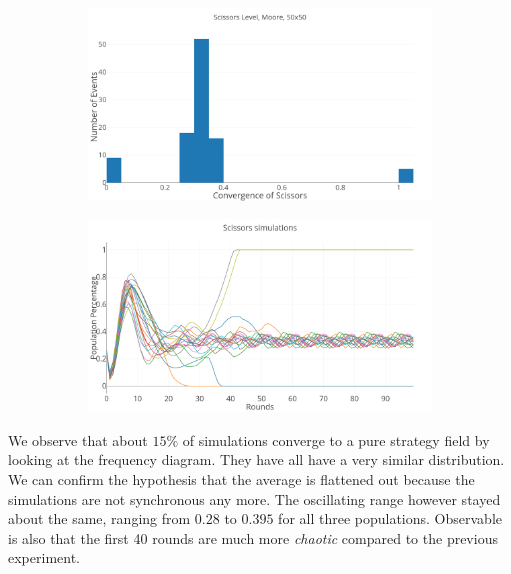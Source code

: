 \documentclass[a4paper, 11pt]{article}
\begin{document}
\begin{figure}[H]
	\begin{subfigure}{0.52\textwidth}
		\includegraphics[width=1\linewidth]{50x50_50RockDist_ScissorsHG}
	\end{subfigure}%
	\begin{subfigure}{0.52\textwidth}
		\includegraphics[width=1\linewidth]{50x50_50RockDist_IndividualScissors}
	\end{subfigure}
\end{figure}

	We observe that about $15\%$ of simulations converge to a pure strategy field by looking at the frequency diagram. They have all have a very similar distribution. We can confirm the hypothesis that the average is flattened out because the simulations are not synchronous any more. The oscillating range however stayed about the same, ranging from $0.28$ to $0.395$ for all three populations. Observable is also that the first 40 rounds are much more \textit{chaotic} compared to the previous experiment.
\end{document}
